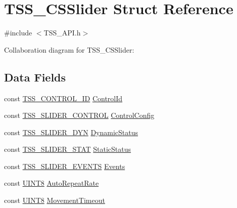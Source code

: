 \hypertarget{struct_t_s_s___c_s_slider}{}\section{T\+S\+S\+\_\+\+C\+S\+Slider Struct Reference}
\label{struct_t_s_s___c_s_slider}


{\ttfamily \#include $<$T\+S\+S\+\_\+\+A\+P\+I.\+h$>$}



Collaboration diagram for T\+S\+S\+\_\+\+C\+S\+Slider\+:
\subsection*{Data Fields}
\begin{DoxyCompactItemize}
\item 
const \hyperlink{struct_t_s_s___c_o_n_t_r_o_l___i_d}{T\+S\+S\+\_\+\+C\+O\+N\+T\+R\+O\+L\+\_\+\+ID} \hyperlink{struct_t_s_s___c_s_slider_afcbd53ab3bcf97cfd8d0a8b45863e11a}{Control\+Id}
\item 
const \hyperlink{struct_t_s_s___s_l_i_d_e_r___c_o_n_t_r_o_l}{T\+S\+S\+\_\+\+S\+L\+I\+D\+E\+R\+\_\+\+C\+O\+N\+T\+R\+OL} \hyperlink{struct_t_s_s___c_s_slider_a6d07df502e32961140b4794be630137b}{Control\+Config}
\item 
const \hyperlink{struct_t_s_s___s_l_i_d_e_r___d_y_n}{T\+S\+S\+\_\+\+S\+L\+I\+D\+E\+R\+\_\+\+D\+YN} \hyperlink{struct_t_s_s___c_s_slider_a758ddd4ded2812f055c8f8ea42ee535c}{Dynamic\+Status}
\item 
const \hyperlink{struct_t_s_s___s_l_i_d_e_r___s_t_a_t}{T\+S\+S\+\_\+\+S\+L\+I\+D\+E\+R\+\_\+\+S\+T\+AT} \hyperlink{struct_t_s_s___c_s_slider_a095e6eb920491a2526b8678a3d6f7124}{Static\+Status}
\item 
const \hyperlink{struct_t_s_s___s_l_i_d_e_r___e_v_e_n_t_s}{T\+S\+S\+\_\+\+S\+L\+I\+D\+E\+R\+\_\+\+E\+V\+E\+N\+TS} \hyperlink{struct_t_s_s___c_s_slider_a6a67c9e8b9b2a0934ae230baff75b66b}{Events}
\item 
const \hyperlink{_t_s_s___data_types_8h_ab27e9918b538ce9d8ca692479b375b6a}{U\+I\+N\+T8} \hyperlink{struct_t_s_s___c_s_slider_aef1117c410a59acb56f45d9674e0dd56}{Auto\+Repeat\+Rate}
\item 
const \hyperlink{_t_s_s___data_types_8h_ab27e9918b538ce9d8ca692479b375b6a}{U\+I\+N\+T8} \hyperlink{struct_t_s_s___c_s_slider_ad3e98b5d97454837cd6293b7abffbe9f}{Movement\+Timeout}
\end{DoxyCompactItemize}


